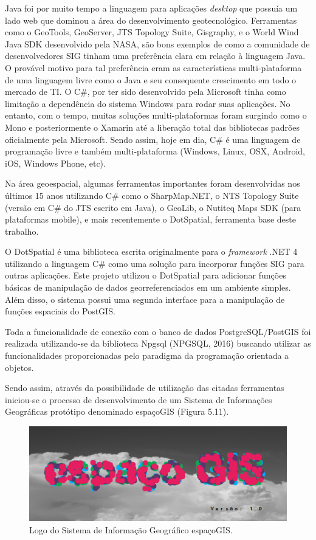 Java foi por muito tempo a linguagem para aplicações \textit{desktop} que possuía um lado web que dominou a área do desenvolvimento geotecnológico. Ferramentas como o GeoTools, GeoServer, JTS Topology Suite, Gisgraphy, e o World Wind Java SDK desenvolvido pela NASA, são bons exemplos de como a comunidade de desenvolvedores SIG tinham uma preferência clara em relação à linguagem Java. O provável motivo para tal preferência eram as características multi-plataforma de uma linguagem livre como o Java e seu consequente crescimento em todo o mercado de TI. O C\#, por ter sido desenvolvido pela Microsoft tinha como limitação a dependência do sistema Windows para rodar suas aplicações. No entanto, com o tempo, muitas soluções multi-plataformas foram surgindo como o Mono e posteriormente o Xamarin até a liberação total das bibliotecas padrões oficialmente pela Microsoft. Sendo assim, hoje em dia, C\# é uma linguagem de programação livre e também multi-plataforma (Windows, Linux, OSX, Android, iOS, Windows Phone, etc). 

Na área geoespacial, algumas ferramentas importantes foram desenvolvidas nos últimos 15 anos utilizando C\# como o SharpMap.NET, o NTS Topology Suite (versão em C\# do JTS escrito em Java), o GeoLib, o Nutiteq Maps SDK (para plataformas mobile), e mais recentemente o DotSpatial, ferramenta base deste trabalho.

O DotSpatial é uma biblioteca escrita originalmente para o \textit{framework} .NET 4 utilizando a linguagem C\# como uma solução para incorporar funções SIG para outras aplicações. Este projeto utilizou o DotSpatial para adicionar funções básicas de manipulação de dados georreferenciados em um ambiente simples. Além disso, o sistema possui uma segunda interface para a manipulação de funções espaciais do PostGIS. 

Toda a funcionalidade de conexão com o banco de dados PostgreSQL/PostGIS foi realizada utilizando-se da biblioteca Npgsql (NPGSQL, 2016) buscando utilizar as funcionalidades proporcionadas pelo paradigma da programação orientada a objetos.

Sendo assim, através da possibilidade de utilização das citadas ferramentas iniciou-se o processo de desenvolvimento de um Sistema de Informações Geográficas protótipo denominado espaçoGIS (Figura 5.11).

	\begin{figure}
		\centering
		\includegraphics[width=1\linewidth]{data/espacoGIS_logo}
		\caption{Logo do Sistema de Informação Geográfico espaçoGIS.}
		\label{fig:espacogislogo}
	\end{figure}

